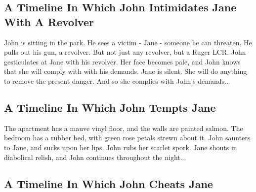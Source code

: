 \documentclass{article}
\begin{document}
\subsection{A Timeline In Which John Intimidates Jane With A Revolver}


John is sitting in the park.
He sees a victim {-} Jane {-} someone he can threaten. He pulls out his gun, a revolver.
But not just any revolver, but a Ruger LCR.
John gesticulates at Jane with his revolver. Her face becomes pale, and John knows that she will comply with with his demands.
Jane is silent. She will do anything to remove the present danger. And so she complies with John's demands...
\subsection{A Timeline In Which John Tempts Jane}


The apartment has a mauve vinyl floor, and the walls are painted salmon.
The bedroom has a rubber bed, with green rose petals strewn about it.
John saunters to Jane, and sucks upon her lips.
John rubs her scarlet spork.
Jane shouts in diabolical relish, and John continues throughout the night...
\subsection{A Timeline In Which John Cheats Jane}
\end{document}
